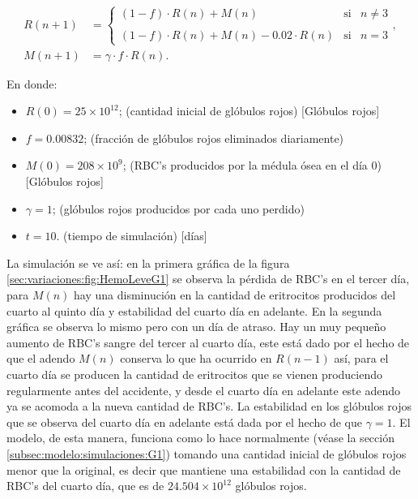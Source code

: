 \begin{align}\label{eq:HemoLeveMal}
    R(n+1) &= \left\{ \begin{array}{lcc} (1-f)\cdot R(n)+M(n) & \textrm{si} & n \neq 3 \\ \\ (1-f)\cdot R(n)+M(n)-0.02\cdot R(n) & \textrm{si} & n = 3\end{array} \right., \\
    M(n+1) &=\gamma \cdot f \cdot R(n). \nonumber
\end{align}

En donde:
\begin{itemize}
    \item $R(0) = 25\times 10^{12}$; (cantidad inicial de glóbulos rojos) [Glóbulos rojos]
    \item $f=0.00832$; (fracción de glóbulos rojos eliminados diariamente)
    \item $M(0) = 208 \times 10^{9}$; (RBC's producidos por la médula ósea en el día 0) [Glóbulos rojos]
    \item $\gamma=1$; (glóbulos rojos producidos por cada uno perdido)
    \item $t = 10$. (tiempo de simulación) [días]
\end{itemize}

La simulación se ve así: en la primera gráfica de la figura \ref{sec:variaciones:fig:HemoLeveG1} se observa la pérdida de RBC's en el tercer día, para $M(n)$ hay una disminución en la cantidad de eritrocitos producidos del cuarto al quinto día y estabilidad del cuarto día en adelante. En la segunda gráfica se observa lo mismo pero con un día de atraso. Hay un muy pequeño aumento de RBC's sangre del tercer al cuarto día, este está dado por el hecho de que el adendo $M(n)$ conserva lo que ha ocurrido en $R(n-1)$ así, para el cuarto día se producen la cantidad de eritrocitos que se vienen produciendo regularmente antes del accidente, y desde el cuarto día en adelante este adendo ya se acomoda a la nueva cantidad de RBC's. La estabilidad en los glóbulos rojos que se observa del cuarto día en adelante está dada por el hecho de que $\gamma = 1$. El modelo, de esta manera, funciona como lo hace normalmente (véase la sección \ref{subsec:modelo:simulaciones:G1}) tomando una cantidad inicial de glóbulos rojos menor que la original, es decir que mantiene una estabilidad con la cantidad de RBC's del cuarto día, que es de $24.504\times 10^{12}$ glóbulos rojos. 

